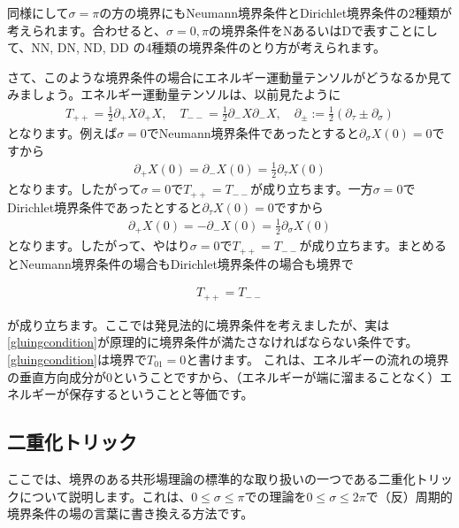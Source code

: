 \documentclass[report,paper=a4, fontsize=12pt, line_length=16cm, number_of_lines=33,dvipdfmx]{jlreq}
\newenvironment{important}{\begin{tcolorbox}[
  colback = white,
  colframe = red!35,
  boxrule = 2mm,
  fonttitle = \bfseries,
  after = \noindent] }{\end{tcolorbox}}
\numberwithin{equation}{chapter}
\numberwithin{equation}{section}
\newcommand{\del}{\partial}
\begin{document}
同様にして$\sigma=\pi$の方の境界にもNeumann境界条件とDirichlet境界条件の2種類が考えられます。合わせると、$\sigma=0,\pi$の境界条件をNあるいはDで表すことにして、NN, DN, ND, DD の4種類の境界条件のとり方が考えられます。

さて、このような境界条件の場合にエネルギー運動量テンソルがどうなるか見てみましょう。エネルギー運動量テンソルは、以前見たように
\begin{align}
  T_{++}=\frac12 \del_{+}X\del_{+}X,\quad
  T_{--}=\frac12 \del_{-}X\del_{-}X,\quad
  \del_{\pm}:=\frac12 (\del_{\tau}\pm \del_{\sigma})
\end{align}
となります。例えば$\sigma=0$でNeumann境界条件であったとすると$\del_{\sigma}X(0)=0$ですから
\begin{align}
  \del_{+}X(0)=\del_{-}X(0)=\frac12 \del_{\tau}X(0)
\end{align}
となります。したがって$\sigma=0$で$T_{++}=T_{--}$が成り立ちます。一方$\sigma=0$でDirichlet境界条件であったとすると$\del_{\tau}X(0)=0$ですから
\begin{align}
  \del_{+}X(0)=-\del_{-}X(0)=\frac12 \del_{\sigma}X(0)
\end{align}
となります。したがって、やはり$\sigma=0$で$T_{++}=T_{--}$が成り立ちます。まとめるとNeumann境界条件の場合もDirichlet境界条件の場合も境界で
\begin{important}
  \begin{align}
    T_{++}=T_{--}\label{gluingcondition}
  \end{align}
\end{important}
が成り立ちます。ここでは発見法的に境界条件を考えましたが、実は\eqref{gluingcondition}が原理的に境界条件が満たさなければならない条件です。
\eqref{gluingcondition}は境界で$T_{01}=0$と書けます。
これは、エネルギーの流れの境界の垂直方向成分が$0$ということですから、（エネルギーが端に溜まることなく）エネルギーが保存するということと等価です。

\subsection{二重化トリック}
ここでは、境界のある共形場理論の標準的な取り扱いの一つである二重化トリックについて説明します。これは、$0\le \sigma \le \pi$での理論を$0\le \sigma \le 2\pi$で（反）周期的境界条件の場の言葉に書き換える方法です。
\end{document}
